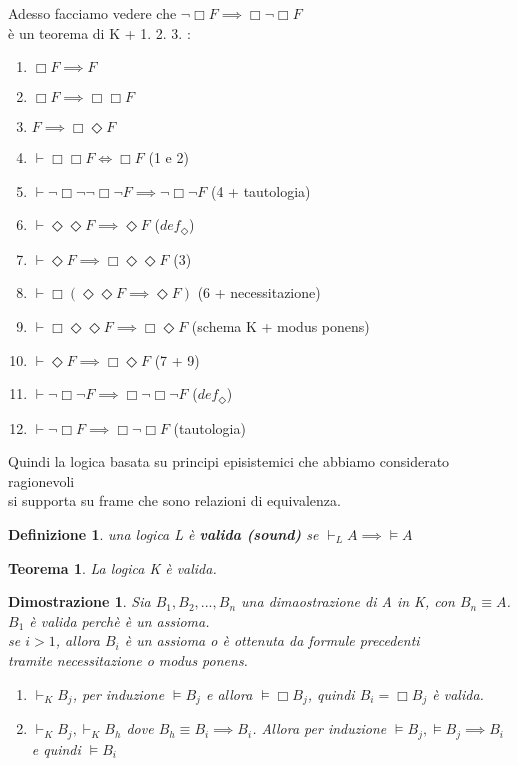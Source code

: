 \documentclass[a4paper,12pt]{article}
\theoremstyle{def}
\newtheorem*{definition}{Definizione}
\theoremstyle{prop}
\theoremstyle{esempio}
\theoremstyle{dimostrazione}
\newtheorem*{dimostrazione}{Dimostrazione}
\theoremstyle{teo}
\newtheorem*{teorema}{Teorema}
\theoremstyle{osservazione}
\begin{document}
\newpage
Adesso facciamo vedere che \(\neg \Box F \implies \Box \neg \Box F\)\\
è un teorema di K + 1. 2. 3. :
\begin{enumerate}
	\item \(\Box F \implies F\)
	\item \(\Box F \implies \Box \Box F\)
	\item \(F \implies \Box \Diamond F\)
	\item \(\vdash \Box \Box F \iff \Box F\) (1 e 2)
	\item \(\vdash \neg \Box \neg \neg \Box \neg F \implies \neg \Box \neg F\) (4 + tautologia)
	\item \(\vdash \Diamond \Diamond F \implies \Diamond F\) (\(def_\Diamond\))
	\item \(\vdash \Diamond F \implies \Box \Diamond \Diamond F\) (3)
	\item \(\vdash \Box(\Diamond \Diamond F \implies \Diamond F)\) (6 + necessitazione)
	\item \(\vdash \Box \Diamond \Diamond F \implies \Box \Diamond F\) (schema K + modus ponens)
	\item \(\vdash \Diamond F \implies \Box \Diamond F\) (7 + 9)
	\item \(\vdash \neg \Box \neg F \implies \Box \neg \Box \neg F\) (\(def_\Diamond\))
	\item \(\vdash \neg \Box F \implies \Box \neg \Box F\) (tautologia)
\end{enumerate}
Quindi la logica basata su principi episistemici che abbiamo considerato ragionevoli\\
si supporta su frame che sono relazioni di equivalenza.\\
\begin{definition}
	una logica L è \textbf{valida (sound)} se \(\vdash_L A \implies \vDash A\)
\end{definition}
\begin{teorema}
	La logica K è valida.
\end{teorema}
\begin{dimostrazione}
	Sia \(B_1,B_2,...,B_n\) una dimaostrazione di A in K, con \(B_n \equiv A\).\\
	\(B_1\) è valida perchè è un assioma.\\
	se \(i > 1\), allora \(B_i\) è un assioma o è ottenuta da formule precedenti\\
	tramite necessitazione o modus ponens.
	\begin{enumerate}
		\item \(\vdash_K B_j\), per induzione \(\vDash B_j\) e allora \(\vDash \Box B_j\), quindi \(B_i = \Box B_j\) è valida.
		\item \(\vdash_K B_j, \vdash_K B_h\) dove \(B_h \equiv B_i \implies B_i\). Allora per induzione \(\vDash B_j, \vDash B_j \implies B_i\)\\
				e quindi \(\vDash B_i\)
	\end{enumerate}
\end{dimostrazione}
\end{document}
